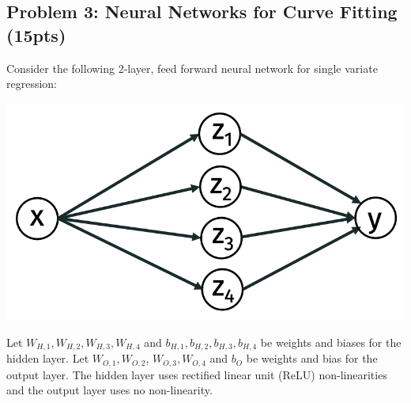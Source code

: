 \documentclass[10pt]{article}
\begin{document}
\subsection{Problem 3: Neural Networks for Curve Fitting (15pts)}
Consider the following 2-layer, feed forward neural network for single variate regression:
\begin{center}
	\includegraphics[width=.3\textwidth]{simple_net.png}
\end{center}
Let $W_{H,1}, W_{H,2}, W_{H,3}, W_{H,4}$ and $b_{H,1}, b_{H,2},b_{H,3},b_{H,4}$ be weights and biases for the hidden layer. Let $W_{O,1}, W_{O,2}$, $W_{O,3}, W_{O,4}$ and $b_{O}$ be weights and bias for the output layer. The hidden layer uses rectified linear unit (ReLU) non-linearities and the output layer uses no non-linearity.
\end{document}
